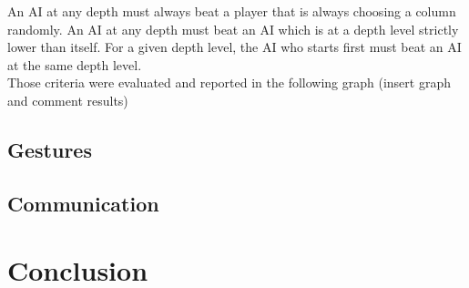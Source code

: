 \documentclass[12pt, a4paper, oneside]{report}
\begin{document}
\hspace*{1cm} An AI at any depth must always beat a player that is always choosing a column randomly.
\hspace*{1cm} An AI at any depth must beat an AI which is at a depth level strictly lower than itself.
\hspace*{1cm} For a given depth level, the AI who starts first must beat an AI at the same depth level.\\

Those criteria were evaluated and reported in the following graph (insert graph and comment results) \\


	\section{Gestures}

	\section{Communication}

	\chapter{Conclusion}
\end{document}
